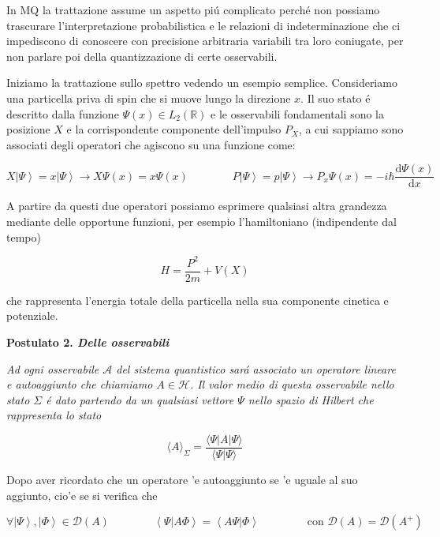 In MQ la trattazione assume un aspetto pi\'u complicato perch\'e non possiamo trascurare l'interpretazione probabilistica e le relazioni di indeterminazione che ci impediscono di conoscere con precisione arbitraria variabili tra loro coniugate, per non parlare poi della quantizzazione di certe osservabili.

Iniziamo la trattazione sullo spettro vedendo un esempio semplice. Consideriamo una particella priva di spin che si muove lungo la direzione $x$. Il suo stato \'e descritto dalla funzione $\Psi(x) \in L_2(\mathbb{R})$ e le osservabili fondamentali sono la posizione $X$ e la corrispondente componente dell'impulso $P_X$, a cui sappiamo sono associati degli operatori che agiscono su una funzione come:

\begin{equation}
	X\left|\Psi\right\rangle=x\left|\Psi\right\rangle\longrightarrow X\Psi(x)=x\Psi(x)\qquad\qquad P\left|\Psi\right\rangle=p\left|\Psi\right\rangle\longrightarrow P_{x}\Psi(x)=-i\hbar\frac{\mathrm{d}\Psi(x)}{\mathrm{d}x}
\end{equation}

A partire da questi due operatori possiamo esprimere qualsiasi altra grandezza mediante delle opportune funzioni, per esempio l'hamiltoniano (indipendente dal tempo)

\begin{equation}
	H={\frac{P^{2}}{2m}}+V(X)
\end{equation}

che rappresenta l'energia totale della particella nella sua componente cinetica e potenziale.


\textbf{Postulato 2. \textit{Delle osservabili}} 

\textit{Ad ogni osservabile $\mathcal{A}$ del sistema quantistico sar\'a associato un operatore lineare e autoaggiunto che chiamiamo $A \in \mathcal{H}$. Il valor medio di questa osservabile nello stato $\Sigma$ \'e dato partendo da un qualsiasi vettore $\Psi$ nello spazio di Hilbert che rappresenta lo stato}

$$\langle A\rangle_{\Sigma}=\frac{\langle\Psi|A|\Psi\rangle}{\langle\Psi|\Psi\rangle}$$

Dopo aver ricordato che un operatore 'e autoaggiunto se 'e uguale al suo aggiunto, cio'e se si verifica che

$$\forall\left|\Psi\right\rangle,\left|\Phi\right\rangle\in\mathcal{D}(A) \qquad\qquad \left\langle\Psi|A\Phi\right\rangle=\left\langle A\Psi|\Phi\right\rangle \qquad\qquad \text{ con } {\mathcal{D}}(A)={\mathcal{D}}(A^{+})$$

